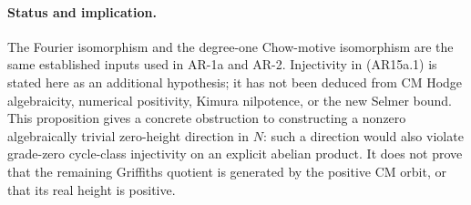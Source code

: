 \paragraph{Status and implication.}
The Fourier isomorphism and the degree-one Chow-motive isomorphism
are the same established inputs used in AR-1a and AR-2.
Injectivity in (AR15a.1) is stated here as an additional hypothesis;
it has not been deduced from CM Hodge algebraicity, numerical
positivity, Kimura nilpotence, or the new Selmer bound.
This proposition gives a concrete obstruction to constructing a
nonzero algebraically trivial zero-height direction in \(N\):
such a direction would also violate grade-zero cycle-class
injectivity on an explicit abelian product. It does not prove
that the remaining Griffiths quotient is generated by the
positive CM orbit, or that its real height is positive.
